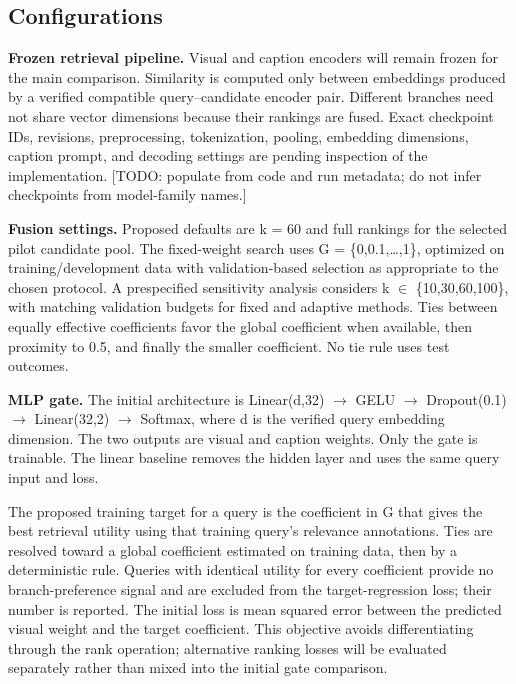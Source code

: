 \subsection{Configurations}

\textbf{Frozen retrieval pipeline.} Visual and caption encoders will remain frozen for the main comparison. Similarity is computed only between embeddings produced by a verified compatible query--candidate encoder pair. Different branches need not share vector dimensions because their rankings are fused. Exact checkpoint IDs, revisions, preprocessing, tokenization, pooling, embedding dimensions, caption prompt, and decoding settings are pending inspection of the implementation. [TODO: populate from code and run metadata; do not infer checkpoints from model-family names.]

\textbf{Fusion settings.} Proposed defaults are k = 60 and full rankings for the selected pilot candidate pool. The fixed-weight search uses G = \{0,0.1,\ldots{},1\}, optimized on training/development data with validation-based selection as appropriate to the chosen protocol. A prespecified sensitivity analysis considers k \(\in\) \{10,30,60,100\}, with matching validation budgets for fixed and adaptive methods. Ties between equally effective coefficients favor the global coefficient when available, then proximity to 0.5, and finally the smaller coefficient. No tie rule uses test outcomes.

\textbf{MLP gate.} The initial architecture is Linear(d,32) \(\rightarrow\) GELU \(\rightarrow\) Dropout(0.1) \(\rightarrow\) Linear(32,2) \(\rightarrow\) Softmax, where d is the verified query embedding dimension. The two outputs are visual and caption weights. Only the gate is trainable. The linear baseline removes the hidden layer and uses the same query input and loss.

The proposed training target for a query is the coefficient in G that gives the best retrieval utility using that training query's relevance annotations. Ties are resolved toward a global coefficient estimated on training data, then by a deterministic rule. Queries with identical utility for every coefficient provide no branch-preference signal and are excluded from the target-regression loss; their number is reported. The initial loss is mean squared error between the predicted visual weight and the target coefficient. This objective avoids differentiating through the rank operation; alternative ranking losses will be evaluated separately rather than mixed into the initial gate comparison.

